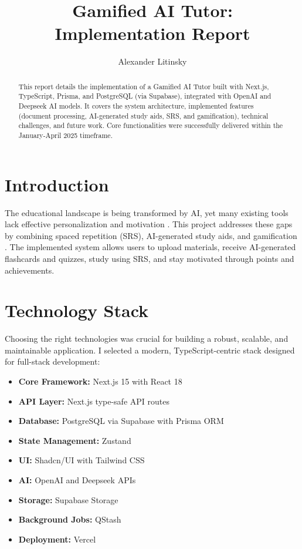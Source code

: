 \documentclass[
	letterpaper,
	11pt
]{jdf}
\author{Alexander Litinsky}
\title{Gamified AI Tutor: Implementation Report}
\begin{document}
\maketitle

\begin{abstract}
This report details the implementation of a Gamified AI Tutor built with Next.js, TypeScript, Prisma, and PostgreSQL (via Supabase), integrated with OpenAI and Deepseek AI models. It covers the system architecture, implemented features (document processing, AI-generated study aids, SRS, and gamification), technical challenges, and future work. Core functionalities were successfully delivered within the January-April 2025 timeframe.
\end{abstract}

\section{Introduction}

The educational landscape is being transformed by AI, yet many existing tools lack effective personalization and motivation \cite{vanlehn2011, dominguez2013}. This project addresses these gaps by combining spaced repetition (SRS), AI-generated study aids, and gamification \cite{kapp2012, gibson2015}. The implemented system allows users to upload materials, receive AI-generated flashcards and quizzes, study using SRS, and stay motivated through points and achievements.

\section{Technology Stack}

Choosing the right technologies was crucial for building a robust, scalable, and maintainable application. I selected a modern, TypeScript-centric stack designed for full-stack development:

\begin{itemize}[noitemsep]
    \item \textbf{Core Framework:} Next.js 15 with React 18
    \item \textbf{API Layer:} Next.js type-safe API routes
    \item \textbf{Database:} PostgreSQL via Supabase with Prisma ORM
    \item \textbf{State Management:} Zustand
    \item \textbf{UI:} Shadcn/UI with Tailwind CSS
    \item \textbf{AI:} OpenAI and Deepseek APIs
    \item \textbf{Storage:} Supabase Storage
    \item \textbf{Background Jobs:} QStash
    \item \textbf{Deployment:} Vercel
\end{itemize}
\end{document}

